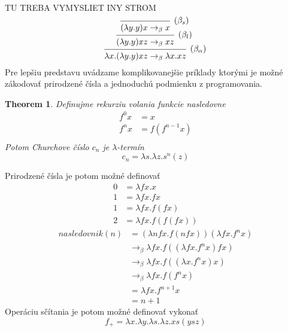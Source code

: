 \documentclass[a4paper,10pt,oneside]{report}%
\newtheorem{theorem}{Theorem}
\begin{document}
TU TREBA VYMYSLIET INY STROM
\begin{equation}
    \begin{prooftree}
        \infer0[($\beta_{s}$)]{(\lambda y.y)x \to_{\beta} x}
        \infer1[($\beta_{l}$)]{(\lambda y.y)xz \to_{\beta} xz}
        \infer1[($\beta_{\alpha}$)]{\lambda x.(\lambda y.y)xz \to_{\beta} \lambda x . xz}
    \end{prooftree}
\end{equation}
    Pre lepšiu predstavu uvádzame komplikovanejšie príklady ktorými je možné
zákodovať prirodzené čísla a jednoduchú podmienku z programovania.
\begin{theorem}
    Definujme rekurziu volania funkcie nasledovne
    \begin{align*}
        f^{0}x &= x \\
        f^{n}x &= f(f^{n-1}x) \\
    \end{align*}
    Potom Churchove číslo $c_{n}$ je $\lambda$-termín
    \begin{equation*}
        c_{n} = \lambda s . \lambda z . s^{n} (z)
    \end{equation*}
\end{theorem}
    Prirodzené čísla je potom možné definovať
\begin{align*}
    0 &= \lambda f x . x \\
    1 &= \lambda f x . f x \\
    1 &= \lambda f x . f (f x) \\
    2 &= \lambda f x . f ( f (f x))
\end{align*}
\begin{align*}
    nasledovnik(n) &=           (\lambda n f x .  f( n f x ))(\lambda f x . f^{n} x) \\
                   &\to_{\beta} \lambda f x . f (( \lambda f x . f^{n} x ) f x)      \\
                   &\to_{\beta} \lambda f x . f (( \lambda x . f^{n} x) x)           \\
                   &\to_{\beta} \lambda f x . f (f^{n} x)                            \\
                   &=           \lambda f x . f^{n+1} x                              \\
                   &= n + 1
\end{align*}
    Operáciu sčítania je potom možné definovať vykonať
\begin{equation*}
    f_{+} = \lambda x. \lambda y. \lambda s. \lambda z. x s (y s z)
\end{equation*}
\end{document}
